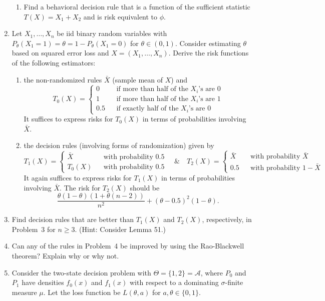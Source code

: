 \documentclass[11pt]{article}
\begin{document}
\begin{enumerate}
\begin{enumerate}
    \item Find a behavioral decision rule that is a function of the sufficient statistic $T(X)=X_1+X_2$ and is risk equivalent to $\phi$.

\end{enumerate}
\item Let $X_1,\ldots,X_n$ be iid binary random variables with $P_\theta(X_1=1)=\theta=1-P_\theta(X_1=0)$ for $\theta \in(0,1)$.  Consider estimating $\theta$ based on squared error loss and $X=(X_1,\ldots,X_n)$.  Derive the risk functions of the following estimators:
    \begin{enumerate}
    \item the non-randomized rules $\bar{X}$ (sample mean of $X$) and
    \[
    T_0(X) = \left\{\begin{array}{lcl}
    0 && \mbox{if more than half of the $X_i$'s are 0}\\
    1 && \mbox{if more than half of the $X_i$'s are 1}\\
    0.5 && \mbox{if exactly half of the $X_i$'s are 0}
    \end{array}\right.
    \]
    It suffices to express risks for $T_0(X)$ in terms of probabilities involving $\bar{X}$.
    \item the decision rules (involving forms of randomization) given by
      \[
    T_1(X) = \left\{\begin{array}{lcl}
    \bar{X} && \mbox{with probability $0.5$}\\
    T_0(X) &&  \mbox{with probability $0.5$}
    \end{array}\right. \quad \& \quad  T_2(X) = \left\{\begin{array}{lcl}
    \bar{X} && \mbox{with probability $\bar{X}$}\\
    0.5 &&  \mbox{with probability $1-\bar{X}$}
    \end{array}\right.
    \]
    It again suffices to express risks for $T_1(X)$ in terms of probabilities involving $\bar{X}$.  The risk for $T_2(X)$ should be
    \[
    \frac{\theta (1-\theta)(1+\theta (n-2))}{n^2}+ (\theta-0.5)^2(1-\theta).
    \]

      \end{enumerate}

\item Find decision rules that are better than $T_1(X)$ and $T_2(X)$, respectively, in Problem~3 for $n\geq 3$.  (Hint: Consider Lemma 51.)
\item Can any of the rules in Problem~4 be improved by using the Rao-Blackwell theorem?  Explain why or why not.
\item   Consider the two-state decision problem with $\Theta=\{1,2\}=\mathcal{A}$, where  $P_0$ and $P_1$ have densities $f_0(x)$ and $f_1(x)$
with respect to a dominating $\sigma$-finite measure $\mu$.  Let the loss function be $L(\theta,a)$ for $a,\theta \in\{0,1\}$.


\end{enumerate}
\end{document}
